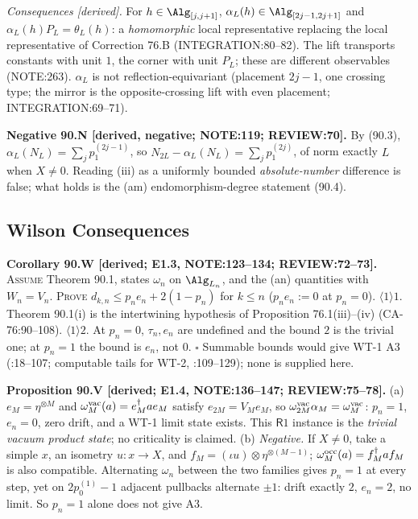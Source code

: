 \emph{Consequences [derived].}  For \(h\in\Alg_{[j,j+1]}\), \(\alpha_L(h)\in\Alg_{[2j-1,2j+1]}\) and
\(\alpha_L(h)P_L=\theta_L(h)\): a \emph{homomorphic} local representative replacing the local representative of
Correction 76.B (INTEGRATION:80--82).  The lift transports constants with unit \(1\), the corner with unit \(P_L\); these
are different observables (NOTE:263).  \(\alpha_L\) is not reflection-equivariant (placement \(2j-1\), one crossing type;
the mirror is the opposite-crossing lift with even placement; INTEGRATION:69--71).

\textbf{Negative 90.N [derived, negative; NOTE:119; REVIEW:70].}  By (90.3), \(\alpha_L(N_L)=\sum_jp_1^{(2j-1)}\), so
\(N_{2L}-\alpha_L(N_L)=\sum_jp_1^{(2j)}\), of norm exactly \(L\) when \(X\ne0\).  Reading (iii) as a uniformly bounded
\emph{absolute-number} difference is false; what holds is the (am) endomorphism-degree statement (90.4).

\subsection{Wilson Consequences}

\textbf{Corollary 90.W [derived; E1.3, NOTE:123--134; REVIEW:72--73].}  \textsc{Assume} Theorem 90.1, states \(\omega_n\) on
\(\Alg_{L_n}\), and the (an) quantities with \(W_n=V_n\).  \textsc{Prove} \(d_{k,n}\le p_ne_n+2(1-p_n)\) for \(k\le n\) (\(p_ne_n:=0\) at \(p_n=0\)).
\(\langle1\rangle1\). Theorem 90.1(i) is the intertwining hypothesis of Proposition 76.1(iii)--(iv) (CA-76:90--108).
\(\langle1\rangle2\). At \(p_n=0\), \(\tau_n,e_n\) are undefined and the bound \(2\) is the trivial one; at \(p_n=1\) the
bound is \(e_n\), not \(0\).  \(\square\)  Summable bounds would give WT-1 A3 (:18--107; computable
tails for WT-2, :109--129); none is supplied here.

\textbf{Proposition 90.V [derived; E1.4, NOTE:136--147; REVIEW:75--78].}  (a) \(e_M=\eta^{\otimes M}\) and
\(\omega^{\rm vac}_M(a)=e_M^\dagger ae_M\) satisfy \(e_{2M}=V_Me_M\), so \(\omega^{\rm vac}_{2M}\alpha_M=\omega^{\rm vac}_M\): \(p_n=1\),
\(e_n=0\), zero drift, and a WT-1 limit state exists.  This \(\mathsf R1\) instance is the \emph{trivial vacuum product
state}; no criticality is claimed.  (b) \emph{Negative.}  If \(X\ne0\), take a simple \(x\), an isometry \(u:x\to X\), and
\(f_M=(\iota u)\otimes\eta^{\otimes(M-1)}\); \(\omega^{\rm occ}_M(a)=f_M^\dagger af_M\) is also compatible.  Alternating
\(\omega_n\) between the two families gives \(p_n=1\) at every step, yet on \(2p_0^{(1)}-1\) adjacent pullbacks alternate
\(\pm1\): drift exactly \(2\), \(e_n=2\), no limit.  So \(p_n=1\) alone does not give A3.

